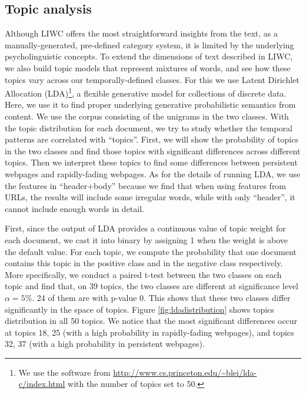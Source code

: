 \documentclass[phd,tocprelim]{cornell}
\begin{document}
\subsection{Topic analysis}

Although LIWC offers the most straightforward insights from the text, as a manually-generated, pre-defined category system, it is limited by the underlying psycholinguistic concepts.
To extend the dimensions of text described in LIWC, we also build topic models that represent mixtures of words,
and see how these topics vary across our temporally-defined classes.
For this we use 
Latent Dirichlet Allocation (LDA)\footnote{We use the software
from \url{http://www.cs.princeton.edu/~blei/lda-c/index.html}
with the number of topics set to 50.
}, a flexible generative model for collections of discrete data\cite{Blei:03}. Here, we use it to find proper underlying generative probabilistic semantics from content. We use the corpus consisting of the unigrams in the two classes. 
With the topic distribution for each document, we try to study whether the temporal patterns are correlated with ``topics''. 
First, we will show the probability of topics in the two classes and find those topics with significant differences across different topics.  
Then we interpret these topics to find some differences between
persistent webpages and rapidly-fading webpages. As for the details of
running LDA, we use the features in ``header+body'' because we find
that when using features from URLs, the results will include some
irregular words, while with only ``header'', it cannot include enough
words in detail. 

First, since the output of LDA provides a
continuous value of topic weight for each document, we cast it into binary by assigning 1 when the weight is above the default value. For each topic, we compute the probability that one
document contains this topic in the positive class and in the negative class
respectively. More specifically, we conduct a paired t-test between the two classes on each topic and find that, on 39 topics, the two classes are  different at significance level $\alpha=5\%$. 24 of them are with p-value $0$. This shows that these two classes differ significantly in the space of topics.
Figure \ref{fig:ldadistribution} shows topics distribution in all 50 topics.  
We notice that the most significant differences occur at topics 18, 25 (with a high probability in rapidly-fading webpages), and topics 32, 37 (with a high probability in persistent webpages).
\end{document}
